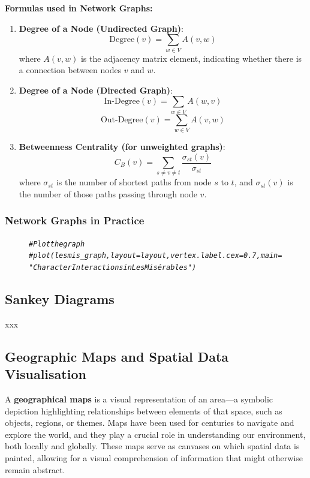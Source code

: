 \documentclass{article}\usepackage[]{graphicx}\usepackage[]{xcolor}
\makeatletter
\newcommand{\hlcom}[1]{\textcolor[rgb]{0.678,0.584,0.686}{\textit{#1}}}%
\newenvironment{kframe}{%
 \def\at@end@of@kframe{}%
 \ifinner\ifhmode%
  \def\at@end@of@kframe{\end{minipage}}%
  \begin{minipage}{\columnwidth}%
 \fi\fi%
 \def\FrameCommand##1{\hskip\@totalleftmargin \hskip-\fboxsep
 \colorbox{shadecolor}{##1}\hskip-\fboxsep
     \hskip-\linewidth \hskip-\@totalleftmargin \hskip\columnwidth}%
 \MakeFramed {\advance\hsize-\width
   \@totalleftmargin\z@ \linewidth\hsize
   \@setminipage}}%
 {\par\unskip\endMakeFramed%
 \at@end@of@kframe}
\newenvironment{knitrout}{}{} %
\makeatother
\begin{document}
\textbf{Formulas used in Network Graphs:}

\begin{enumerate}
\item \textbf{Degree of a Node (Undirected Graph)}:
\[
\text{Degree}(v) = \sum_{w \in V} A(v, w)
\]
where \(A(v, w)\) is the adjacency matrix element, indicating whether there is a connection between nodes \(v\) and \(w\).
\item \textbf{Degree of a Node (Directed Graph)}:
\[
\text{In-Degree}(v) = \sum_{w \in V} A(w, v)
\]
\[
\text{Out-Degree}(v) = \sum_{w \in V} A(v, w)
\]
\item \textbf{Betweenness Centrality (for unweighted graphs)}:
\[
C_B(v) = \sum_{s \neq v \neq t} \frac{\sigma_{st}(v)}{\sigma_{st}}
\]
where \(\sigma_{st}\) is the number of shortest paths from node \(s\) to \(t\), and \(\sigma_{st}(v)\) is the number of those paths passing through node \(v\).
\end{enumerate}

\subsubsection{Network Graphs in Practice}




\begin{figure}[h]
\centering
\begin{knitrout}\scriptsize
{}\color{fgcolor}\begin{kframe}
\begin{alltt}
\hlcom{# Plot the graph}
\hlcom{#plot(lesmis_graph, layout = layout, vertex.label.cex = 0.7, main = "Character Interactions in Les Misérables")}
\end{alltt}
\end{kframe}
\end{knitrout}
\end{figure}

\subsection{Sankey Diagrams}
xxx

\subsection{Geographic Maps and Spatial Data Visualisation}

A \textbf{geographical maps} is a visual representation of an area—a symbolic depiction highlighting relationships between elements of that space, such as objects, regions, or themes. Maps have been used for centuries to navigate and explore the world, and they play a crucial role in understanding our environment, both locally and globally. These maps serve as canvases on which spatial data is painted, allowing for a visual comprehension of information that might otherwise remain abstract.
\end{document}

